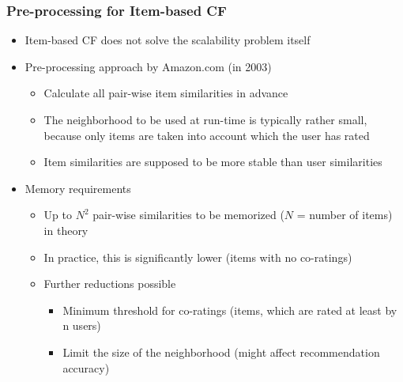 \documentclass{beamer}
\begin{document}
\begin{frame}
    \frametitle{Pre-processing for Item-based CF}
    \begin{itemize}
    \item Item-based CF does not solve the scalability problem itself
    \item Pre-processing approach by Amazon.com (in 2003)
        \begin{itemize}
        \item Calculate all pair-wise item similarities in advance
        \item The neighborhood to be used at run-time is typically rather
            small, because only items are taken into account which the user has
            rated
        \item Item similarities are supposed to be more stable than user
            similarities
        \end{itemize}
    \item Memory requirements
        \begin{itemize}
        \item Up to $N^2$ pair-wise similarities to be memorized ($N$ = number
            of items) in theory
        \item In practice, this is significantly lower (items with no
            co-ratings)
        \item Further reductions possible
            \begin{itemize}
            \item Minimum threshold for co-ratings (items, which are rated at
                least by n users)
            \item Limit the size of the neighborhood (might affect
                recommendation accuracy)
            \end{itemize}
        \end{itemize}
    \end{itemize}
\end{frame}
\end{document}
